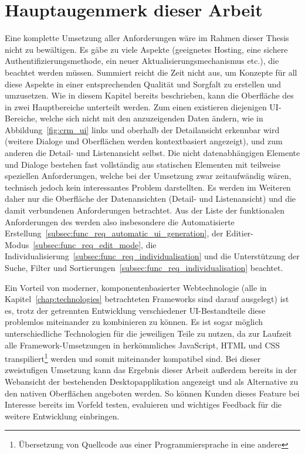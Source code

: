 \section{Hauptaugenmerk dieser Arbeit}
Eine komplette Umsetzung aller Anforderungen wäre im Rahmen dieser Thesis nicht zu bewältigen. Es gäbe zu viele Aspekte (geeignetes Hosting, eine sichere Authentifizierungsmethode, ein neuer Aktualisierungsmechanismus etc.), die beachtet werden müssen. Summiert reicht die Zeit nicht aus, um Konzepte für all diese Aspekte in einer entsprechenden Qualität und Sorgfalt zu erstellen und umzusetzen. 
Wie in diesem Kapitel bereits beschrieben, kann die Oberfläche des  in zwei Hauptbereiche unterteilt werden. Zum einen existieren diejenigen UI-Bereiche, welche sich nicht mit den anzuzeigenden Daten ändern, wie in Abbildung~\ref{fig:crm_ui} links und oberhalb der Detailansicht erkennbar wird (weitere Dialoge und Oberflächen werden kontextbasiert angezeigt), und zum anderen die Detail- und Listenansicht selbst. Die nicht datenabhängigen Elemente und Dialoge bestehen fast vollständig aus statischen Elementen mit teilweise speziellen Anforderungen, welche bei der Umsetzung zwar zeitaufwändig wären, technisch jedoch kein interessantes Problem darstellten. Es werden im Weiteren daher nur die Oberfläche der Datenansichten (Detail- und Listenansicht) und die damit verbundenen Anforderungen betrachtet.
Aus der Liste der funktionalen Anforderungen des  werden also insbesondere die Automatisierte Erstellung~\ref{subsec:func_req_automatic_ui_generation}, der Editier-Modus~\ref{subsec:func_req_edit_mode}, die Individualisierung~\ref{subsec:func_req_individualisation} und die Unterstützung der Suche, Filter und Sortierungen~\ref{subsec:func_req_individualisation} beachtet.

Ein Vorteil von moderner, komponentenbasierter Webtechnologie (alle in Kapitel~\ref{chap:technologies} betrachteten Frameworks sind darauf ausgelegt) ist es, trotz der getrennten Entwicklung verschiedener UI-Bestandteile diese problemlos miteinander zu kombinieren zu können. Es ist sogar möglich unterschiedliche Technologien für die jeweiligen Teile zu nutzen, da zur Laufzeit alle Framework-Umsetzungen in herkömmliches JavaScript, HTML und CSS transpiliert\footnote{Übersetzung von Quellcode aus einer Programmiersprache in eine andere} werden und somit miteinander kompatibel sind.
Bei dieser zweistufigen Umsetzung kann das Ergebnis dieser Arbeit außerdem bereits in der Webansicht der bestehenden Desktopapplikation angezeigt und als Alternative zu den nativen Oberflächen angeboten werden. So können Kunden dieses Feature bei Interesse bereits im Vorfeld testen, evaluieren und wichtiges Feedback für die weitere Entwicklung einbringen.
